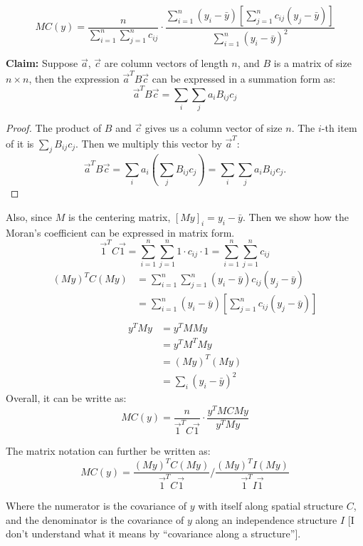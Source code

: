 \documentclass[12pt]{article}
\begin{document}
\[
M C(y) = \frac{n}{\sum_{i=1}^n \sum_{j=1}^n c_{ij}} \cdot \frac{\sum_{i=1}^n \left(y_i - \bar{y} \right) \left[ \sum_{j=1}^n c_{ij} \left( y_j - \bar{y} \right) \right]}{\sum_{i=1}^n \left( y_i - \bar{y} \right)^2}
\]

{\bf Claim:} Suppose \( \vec{a} \), \( \vec{c} \) are column vectors of length \( n \), and \( B \) is a matrix of size \( n \times n \),  then the expression \( \vec{a}^T B \vec{c} \) can be expressed in a summation form as:
\[
  \vec{a}^T B \vec{c} = \sum_i \sum_j a_i B_{ij} c_j
\]
\begin{proof}
  The product of \( B \) and \( \vec{c} \) gives us a column vector of size \( n \). The \( i \)-th item of it is \( \sum_j B_{ij} c_j \). Then we multiply this vector by \( \vec{a}^T \):
  \[
    \vec{a}^T B \vec{c} = \sum_i a_i \left( \sum_j B_{ij} c_j \right) = \sum_i \sum_j a_i B_{ij} c_j.
  \]
\end{proof}

Also, since \( M \) is the centering matrix, \( [M y]_i = y_i - \bar{y} \). Then we show how the Moran's coefficient can be expressed in matrix form.
\[
  \vec{1}^T C \vec{1} = \sum_{i=1}^n \sum_{j=1}^n 1 \cdot c_{i j} \cdot 1 = \sum_{i=1}^n \sum_{j=1}^n c_{i j} 
\]
\begin{align*}
  (M y)^T C (M y) & = \sum_{i=1}^n \sum_{j=1}^n (y_i - \bar{y}) c_{ij} (y_{j} - \bar{y}) \\
                  & = \sum_{i=1}^n(y_i-\bar{y})[\sum_{j=1}^n c_{i j}(y_j-\bar{y})]  \\
\end{align*}
\begin{align*}
  y^T M y & = y^T M M y \\
          & = y^T M^T M y \\
          & = (M y)^T (M y) \\
          & = \sum_i (y_i - \bar{y})^2
\end{align*}
Overall, it can be writte as:
\[
  M C(y) = \frac{n}{\vec{1}^T C \vec{1}} \cdot \frac{y^T M C M y}{y^T M y}
\]

The matrix notation can further be written as:
\[
  M C (y) = \frac{(M y)^T C (M y)}{\vec{1}^T C \vec{1}} / \frac{(M y)^T I (M y)}{\vec{1}^T I \vec{1}}
\]

Where the numerator is the covariance of \( y \) with itself along spatial structure \( C \), and the denominator is the covariance of \( y \) along an independence structure \( I \) [I don't understand what it means by ``covariance along a structure''].
\end{document}
